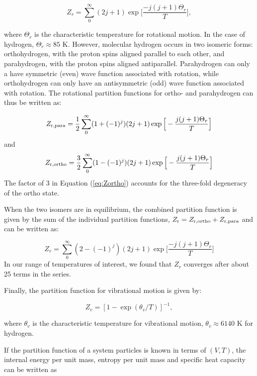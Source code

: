 \documentclass[apj]{emulateapj}
\begin{document}
\begin{equation}
\label{eq:Zr}
Z_r=\sum_0^\infty (2 j+1) \exp{\Big[\frac{-j (j+1)\Theta_r}{T}\Big]},
\end{equation}

\noindent where $\Theta_r$ is the characteristic temperature for rotational motion. In the case of hydrogen, $\Theta_r \approx 85$ K. However, molecular hydrogen occurs in two isomeric forms: orthohydrogen, with the proton spins aligned parallel to each other, and parahydrogen, with the proton spins aligned antiparallel. Parahydrogen can only a have symmetric (even) wave function associated with rotation, while orthohydrogen can only have an antisymmetric (odd) wave function associated with rotation. The rotational partition functions for ortho- and parahydrogen can thus be written as:

\begin{equation}
\label{eq:Zpara}
Z_{\rm{r,para}}=\frac{1}{2}\sum_0^\infty (1+(-1)^j) (2 j +1) \exp\Big[-\frac{j(j+1)\Theta_r}{T}\Big]
\end{equation}
and
\begin{equation}
\label{eq:Zortho}
Z_{\rm{r,ortho}}=\frac{3}{2}\sum_0^\infty (1-(-1)^j) (2 j +1) \exp\Big[-\frac{j(j+1)\Theta_r}{T}\Big]
\end{equation}
The factor of 3 in Equation (\ref{eq:Zortho}) accounts for the three-fold degeneracy of the ortho state.

 When the two isomers are in equilibrium, the combined partition function is given by the sum of the individual partition functions, $Z_{\rm r}=Z_{\rm{r, ortho}}+Z_{\rm{r,para}}$ and can be written as:

\begin{equation}
\label{eq:Zrspin}
Z_r=\sum_0^\infty (2-(-1)^j) (2j+1) \exp{\Big[\frac{-j (j+1) \Theta_r}{T}\Big]}
\end{equation}
In our range of temperatures of interest, we found that $Z_r$ converges after about 25 terms in the series.


Finally, the partition function for vibrational motion is given by:

\begin{equation}
\label{eq:Zv}
Z_v=[1-\exp{(\theta_v/T)}]^{-1},
\end{equation}

\noindent where $\theta_v$ is the characteristic temperature for vibrational motion, $\theta_v \approx 6140$ K for hydrogen. 

If the partition function of a system particles is known in terms of $(V, T)$, the internal energy per unit mass, entropy per unit mass and specific heat capacity can be written as
\end{document}
